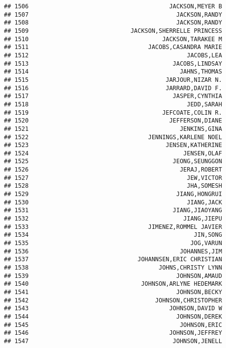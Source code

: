 \documentclass[
]{article}
\begin{document}
\begin{verbatim}
## 1506                                        JACKSON,MEYER B
## 1507                                          JACKSON,RANDY
## 1508                                          JACKSON,RANDY
## 1509                             JACKSON,SHERRELLE PRINCESS
## 1510                                      JACKSON,TARAKEE M
## 1511                                  JACOBS,CASANDRA MARIE
## 1512                                             JACOBS,LEA
## 1513                                         JACOBS,LINDSAY
## 1514                                           JAHNS,THOMAS
## 1515                                       JARJOUR,NIZAR N.
## 1516                                       JARRARD,DAVID F.
## 1517                                         JASPER,CYNTHIA
## 1518                                             JEDD,SARAH
## 1519                                      JEFCOATE,COLIN R.
## 1520                                        JEFFERSON,DIANE
## 1521                                           JENKINS,GINA
## 1522                                  JENNINGS,KARLENE NOEL
## 1523                                       JENSEN,KATHERINE
## 1524                                            JENSEN,OLAF
## 1525                                         JEONG,SEUNGGON
## 1526                                           JERAJ,ROBERT
## 1527                                             JEW,VICTOR
## 1528                                             JHA,SOMESH
## 1529                                          JIANG,HONGRUI
## 1530                                             JIANG,JACK
## 1531                                         JIANG,JIAOYANG
## 1532                                            JIANG,JIEPU
## 1533                                  JIMENEZ,ROMMEL JAVIER
## 1534                                               JIN,SONG
## 1535                                              JOG,VARUN
## 1536                                           JOHANNES,JIM
## 1537                               JOHANNSEN,ERIC CHRISTIAN
## 1538                                     JOHNS,CHRISTY LYNN
## 1539                                          JOHNSON,AMAUD
## 1540                                JOHNSON,ARLYNE HEDEMARK
## 1541                                          JOHNSON,BECKY
## 1542                                    JOHNSON,CHRISTOPHER
## 1543                                        JOHNSON,DAVID W
## 1544                                          JOHNSON,DEREK
## 1545                                           JOHNSON,ERIC
## 1546                                        JOHNSON,JEFFREY
## 1547                                         JOHNSON,JENELL

\end{verbatim}
\end{document}
